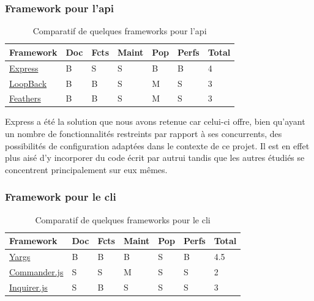 \subsubsection*{Framework pour l'\Gls{api}}


\begin{table}[H]
    \centering
    \begin{tabular}{| l | l | l | l | l | l | l |}
    \hline
        Framework & Doc & Fcts & Maint & Pop & Perfs & Total \\
    \hline
        \href{https://expressjs.com/}{Express} &
        B &  
        S &
        S &            
        B &              
        B &
        4 \\
    \hline
        \href{https://loopback.io/}{LoopBack} &
        B &                
        B &   
        S &
        M &              
        S &      
        3 \\
    \hline
        \href{https://feathersjs.com/}{Feathers} &
        B &                
        B &     
        S &
        M &              
        S &       
        3 \\  
    \hline
    \end{tabular}
    \caption{Comparatif de quelques frameworks pour l'\Gls{api}}
    \label{table:compFrameworksAPI}
\end{table}

Express a été la solution que nous avons retenue car celui-ci offre, bien qu'ayant un nombre de fonctionnalités restreints par rapport à ses concurrents, des possibilités de configuration  adaptées dans le contexte de ce projet. Il est en effet plus aisé d'y incorporer du code écrit par autrui tandis que les autres étudiés se concentrent principalement sur eux mêmes. 

\subsubsection*{Framework pour le \Gls{cli}}

\begin{table}[H]
    \centering
    \begin{tabular}{| l | l | l | l | l | l | l |}
    \hline
        Framework & Doc & Fcts & Maint & Pop & Perfs & Total \\
    \hline
        \href{http://yargs.js.org/}{Yargs} &
        B &  
        B &
        B &            
        S &              
        B &   
        4.5 \\
    \hline
        \href{https://github.com/tj/commander.js}{Commander.js} &
        S &                
        S &   
        M &
        S &              
        S &  
        2 \\
    \hline
        \href{https://github.com/SBoudrias/Inquirer.js}{Inquirer.js} &
        S &                
        B &     
        S &
        S &              
        S &      
        3 \\  
    \hline
    \end{tabular}
    \caption{Comparatif de quelques frameworks pour le \Gls{cli}}
    \label{table:compFrameworksCLI}
\end{table}

